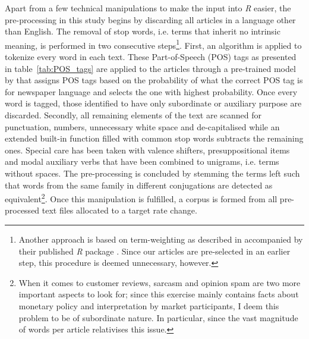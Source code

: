 Apart from a few technical manipulations to make the input into \textit{R} easier, the pre-processing in this study begins by discarding all articles in a language other than English. The removal of stop words, i.e. terms that inherit no intrinsic meaning, is performed in two consecutive steps\footnote{Another approach is based on term-weighting as described in \textcite{Silge.2017} accompanied by their published \textit{R} package \textcite{tidytextpackage}. Since our articles are pre-selected in an earlier step, this procedure is deemed unnecessary, however.}. %
First, an algorithm is applied to tokenize every word in each text. These Part-of-Speech (POS) tags as presented in table~\vref{tab:POS_tags} are applied to the articles through a pre-trained model by \textcite{OpenNLP.2016} that assigns POS tags based on the probability of what the correct POS tag is for newspaper language and selects the one with highest probability. Once every word is tagged, those identified to have only subordinate or auxiliary purpose are discarded. Secondly, all remaining elements of the text are scanned for punctuation, numbers, unnecessary white space and de-capitalised while an extended built-in function filled with common stop words subtracts the remaining ones. Special care has been taken with valence shifters, presuppositional items and modal auxiliary verbs that have been combined to unigrams, i.e. terms without spaces. The pre-processing is concluded by stemming the terms left such that words from the same family in different conjugations are detected as equivalent\footnote{When it comes to customer reviews, sarcasm and opinion spam are two more important aspects to look for; since this exercise mainly contains facts about monetary policy and interpretation by market participants, I deem this problem to be of subordinate nature. In particular, since the vast magnitude of words per article relativises this issue.}. Once this manipulation is fulfilled, a corpus is formed from all pre-processed text files allocated to a target rate change. 


